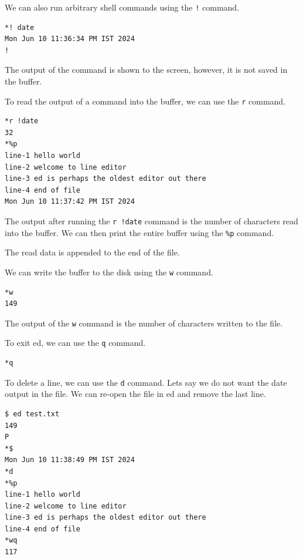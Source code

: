 We can also run arbitrary shell commands using the \texttt{!} command.

\begin{lstlisting}[language=bash]
*! date
Mon Jun 10 11:36:34 PM IST 2024
!
\end{lstlisting}

The output of the command is shown to the screen,
however, it is not saved in the buffer.

To read the output of a command into the buffer,
we can use the \texttt{r} command.

\begin{lstlisting}[language=bash]
*r !date
32
*%p
line-1 hello world
line-2 welcome to line editor
line-3 ed is perhaps the oldest editor out there
line-4 end of file
Mon Jun 10 11:37:42 PM IST 2024
\end{lstlisting}

The output after running the \texttt{r !date} command
is the number of characters read into the buffer.
We can then print the entire buffer using the \texttt{\%p} command.

The read data is appended to the end of the file.

We can write the buffer
to the disk using the \texttt{w} command.

\begin{lstlisting}[language=bash]
*w
149
\end{lstlisting}

The output of the \texttt{w} command is the number of characters written to the file.

To exit ed, we can use the \texttt{q} command.

\begin{lstlisting}[language=bash]
*q
\end{lstlisting}

To delete a line, we can use the \texttt{d} command.
Lets say we do not want the date output in the file.
We can re-open the file in ed and remove the last line.

\begin{lstlisting}[language=bash]
$ ed test.txt
149
P
*$
Mon Jun 10 11:38:49 PM IST 2024
*d
*%p
line-1 hello world
line-2 welcome to line editor
line-3 ed is perhaps the oldest editor out there
line-4 end of file
*wq
117
\end{lstlisting}

